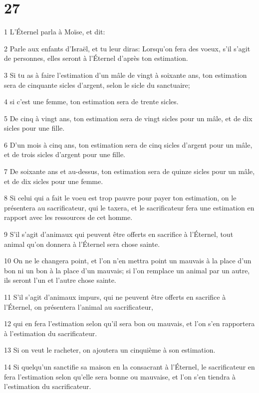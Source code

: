 \chapter{27}

\par 1 L'Éternel parla à Moïse, et dit:
\par 2 Parle aux enfants d'Israël, et tu leur diras: Lorsqu'on fera des voeux, s'il s'agit de personnes, elles seront à l'Éternel d'après ton estimation.
\par 3 Si tu as à faire l'estimation d'un mâle de vingt à soixante ans, ton estimation sera de cinquante sicles d'argent, selon le sicle du sanctuaire;
\par 4 si c'est une femme, ton estimation sera de trente sicles.
\par 5 De cinq à vingt ans, ton estimation sera de vingt sicles pour un mâle, et de dix sicles pour une fille.
\par 6 D'un mois à cinq ans, ton estimation sera de cinq sicles d'argent pour un mâle, et de trois sicles d'argent pour une fille.
\par 7 De soixante ans et au-dessus, ton estimation sera de quinze sicles pour un mâle, et de dix sicles pour une femme.
\par 8 Si celui qui a fait le voeu est trop pauvre pour payer ton estimation, on le présentera au sacrificateur, qui le taxera, et le sacrificateur fera une estimation en rapport avec les ressources de cet homme.
\par 9 S'il s'agit d'animaux qui peuvent être offerts en sacrifice à l'Éternel, tout animal qu'on donnera à l'Éternel sera chose sainte.
\par 10 On ne le changera point, et l'on n'en mettra point un mauvais à la place d'un bon ni un bon à la place d'un mauvais; si l'on remplace un animal par un autre, ils seront l'un et l'autre chose sainte.
\par 11 S'il s'agit d'animaux impurs, qui ne peuvent être offerts en sacrifice à l'Éternel, on présentera l'animal au sacrificateur,
\par 12 qui en fera l'estimation selon qu'il sera bon ou mauvais, et l'on s'en rapportera à l'estimation du sacrificateur.
\par 13 Si on veut le racheter, on ajoutera un cinquième à son estimation.
\par 14 Si quelqu'un sanctifie sa maison en la consacrant à l'Éternel, le sacrificateur en fera l'estimation selon qu'elle sera bonne ou mauvaise, et l'on s'en tiendra à l'estimation du sacrificateur.

